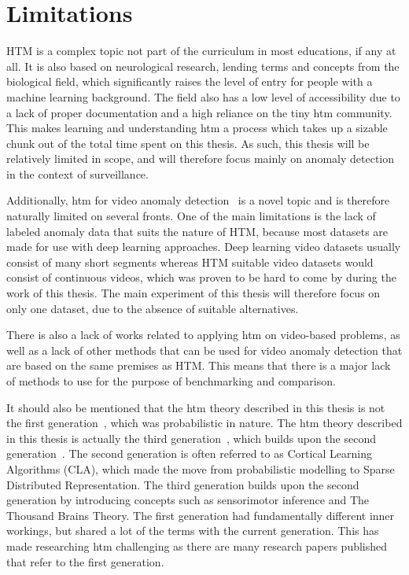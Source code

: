 \section{Limitations}
HTM is a complex topic not part of the curriculum in most educations, if any at all. It is also based on neurological research, lending terms and concepts from the biological field, which significantly raises the level of entry for people with a machine learning background. The field also has a low level of accessibility due to a lack of proper documentation and a high reliance on the tiny \gls*{htm} community. This makes learning and understanding \gls*{htm} a process which takes up a sizable chunk out of the total time spent on this thesis. As such, this thesis will be relatively limited in scope, and will therefore focus mainly on anomaly detection in the context of surveillance.
\par
Additionally, \gls*{htm} for video anomaly detection~\cite{MotionAnomalyDetection} is a novel topic and is therefore naturally limited on several fronts. One of the main limitations is the lack of labeled anomaly data that suits the nature of HTM, because most datasets are made for use with deep learning approaches. Deep learning video datasets usually consist of many short segments whereas HTM suitable video datasets would consist of continuous videos, which was proven to be hard to come by during the work of this thesis. The main experiment of this thesis will therefore focus on only one dataset, due to the absence of suitable alternatives.
\par
There is also a lack of works related to applying \gls*{htm} on video-based problems, as  well as a lack of other methods that can be used for video anomaly detection that are based on the same premises as HTM. This means that there is a major lack of methods to use for the purpose of benchmarking and comparison.
\par
It should also be mentioned that the \gls*{htm} theory described in this thesis is not the first generation~\cite{htm_zeta1}, which was probabilistic in nature. The \gls*{htm} theory described in this thesis is actually the third generation~\cite{htm_gen3, thousandbrains}, which builds upon the second generation~\cite{htm_gen2_sp,htm_gen2_tm}. The second generation is often referred to as Cortical Learning Algorithms (CLA), which made the move from probabilistic modelling to Sparse Distributed Representation. The third generation builds upon the second generation by introducing concepts such as sensorimotor inference and The Thousand Brains Theory. The first generation had fundamentally different inner workings, but shared a lot of the terms with the current generation. This has made researching  \gls*{htm} challenging as there are many research papers published that refer to the first generation.
